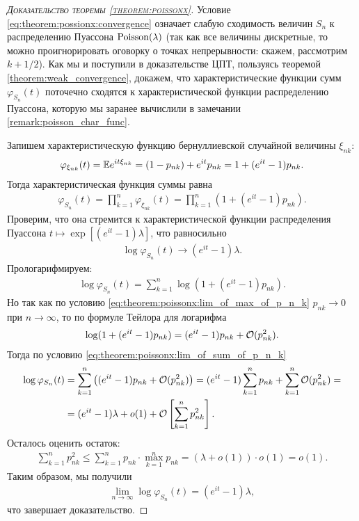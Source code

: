 \documentclass[../main.tex]{subfiles}
\begin{document}
\begin{proof}[\normalfont\textsc{Доказательство теоремы \ref{theorem:poissonx}}]
 Условие \eqref{eq:theorem:possionx:convergence} означает слабую сходимость величин $ S_n $ к распределению Пуассона $ \mathrm{Poisson}(\lambda) $ (так как все величины дискретные, то можно проигнорировать оговорку о точках непрерывности: скажем, рассмотрим $ k + 1 / 2 $). Как мы и поступили в доказательстве ЦПТ, пользуясь теоремой \ref{theorem:weak_convergence}, докажем, что характеристические функции сумм $ \varphi_{S_n}(t) $ поточечно сходятся к характеристической функции распределению Пуассона, которую мы заранее вычислили в замечании \ref{remark:poisson_char_func}.

 Запишем характеристическую функцию бернуллиевской случайной величины $ \xi_{n k} $:
 \begin{align*}
  \varphi_{\xi_{n k}}(t) = \mathbb E e^{it \xi_{n k}} = (1 - p_{n k}) + e^{it} p_{n k} = 1 + (e^{it} - 1)p_{n k}.
 \end{align*} Тогда характеристическая функция суммы равна
 \begin{align*}
  \varphi_{S_n}(t) = \prod_{k=1}^{n} \varphi_{\xi_{n k}}(t) = \prod_{k=1}^{n} (1 + (e^{it} - 1)p_{n k}).
 \end{align*} Проверим, что она стремится к характеристической функции распределения Пуассона $ t \mapsto \exp \left[ (e^{it}-1)\lambda \right] $, что равносильно
 \begin{align*}
  \log \varphi_{S_n}(t) \to (e^{it} - 1)\lambda.
 \end{align*} Прологарифмируем:
 \begin{align*}
  \log \varphi_{S_n}(t) = \sum_{k=1}^{n}\log (1 + (e^{it} - 1)p_{nk}).
 \end{align*} Но так как по условию \eqref{eq:theorem:poissonx:lim_of_max_of_p_n_k} $ p_{n k} \to 0 $ при $ n \to \infty $, то по формуле Тейлора для логарифма
 \begin{align*}
  \log(1 + (e^{it} - 1)p_{n k}) = (e^{it} - 1)p_{n k} + \mathcal{O}(p_{n k}^{2}).
 \end{align*} Тогда по условию \eqref{eq:theorem:poissonx:lim_of_sum_of_p_n_k}
 \begin{align*}
  \log \varphi_{S_n}(t) &= \sum_{k=1}^{n} \left( (e^{it}-1)p_{nk} +\mathcal{O}(p_{nk}^{2}) \right) = (e^{it} - 1) \sum_{k=1}^{n}p_{nk} + \sum_{k = 1}^{n} \mathcal{O}(p_{nk} ^{ 2}) = \\
  &= (e^{it}-1)\lambda + o(1) + \mathcal{O} \left[ \sum_{k=1}^{n}p_{n k}^{2} \right].
 \end{align*} Осталось оценить остаток:
 \begin{align*}
  \sum_{k=1}^{n}p_{nk}^{2} \leqslant \sum_{k=1}^{n} p_{nk} \cdot \max_{k=1}^{n} p_{n k} = (\lambda + o(1)) \cdot o(1) = o(1).
 \end{align*} Таким образом, мы получили
 \begin{align*}
  \lim_{n \to \infty} \log \varphi_{S_n}(t) = (e^{it}-1)\lambda,
 \end{align*} что завершает доказательство.
\end{proof}
\end{document}
